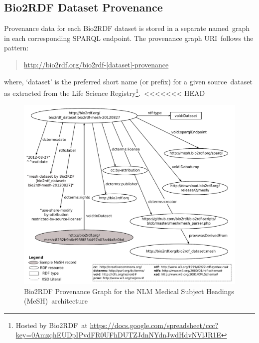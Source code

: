 \documentclass[DIV=calc, paper=a4, fontsize=12pt, onecolumn]{scrartcl}	 %
\begin{document}
  \subsection{Bio2RDF Dataset Provenance}
  Provenance data for each Bio2RDF dataset is stored in a separate named\
  graph in each corresponding SPARQL endpoint. The provenance graph URI\
  follows the pattern:
  \begin{quote}
    \url{http://bio2rdf.org/bio2rdf-[dataset]-provenance}    
  \end{quote}

  \noindent where, `dataset' is the preferred short name (or prefix) for a given source\
  dataset as extracted from the Life Science Registry\footnote{Hosted by Bio2RDF\
  at \url{https://docs.google.com/spreadsheet/ccc?key=0AmzqhEUDpIPvdFR0UFhDUTZJdnNYdnJwdHdvNVlJR1E}}.\
<<<<<<< HEAD
  
  \begin{figure}[ht!]
    \centering
    \includegraphics[scale=2.80,trim=1 1 1 1,clip]{bio2rdf_provenance.png}
    \caption{Bio2RDF Provenance Graph for the NLM Medical Subject Headings (MeSH)\
    architecture~\citep{bio2rdf_wiki_bio2rdf_2013}}
    \label{fig:bio2rdf_provenance}
  \end{figure}  
  
\end{document}
